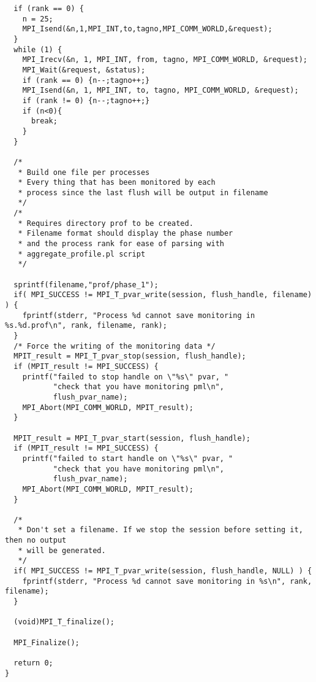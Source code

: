 \documentclass[notitlepage]{article}
\begin{document}
\begin{verbatim}
  if (rank == 0) {
    n = 25;
    MPI_Isend(&n,1,MPI_INT,to,tagno,MPI_COMM_WORLD,&request);
  }
  while (1) {
    MPI_Irecv(&n, 1, MPI_INT, from, tagno, MPI_COMM_WORLD, &request);
    MPI_Wait(&request, &status);
    if (rank == 0) {n--;tagno++;}
    MPI_Isend(&n, 1, MPI_INT, to, tagno, MPI_COMM_WORLD, &request);
    if (rank != 0) {n--;tagno++;}
    if (n<0){
      break;
    }
  }

  /* 
   * Build one file per processes
   * Every thing that has been monitored by each
   * process since the last flush will be output in filename
   */
  /*
   * Requires directory prof to be created.
   * Filename format should display the phase number
   * and the process rank for ease of parsing with
   * aggregate_profile.pl script
   */

  sprintf(filename,"prof/phase_1");
  if( MPI_SUCCESS != MPI_T_pvar_write(session, flush_handle, filename) ) {
    fprintf(stderr, "Process %d cannot save monitoring in %s.%d.prof\n", rank, filename, rank);
  }
  /* Force the writing of the monitoring data */
  MPIT_result = MPI_T_pvar_stop(session, flush_handle);
  if (MPIT_result != MPI_SUCCESS) {
    printf("failed to stop handle on \"%s\" pvar, "
           "check that you have monitoring pml\n",
           flush_pvar_name);
    MPI_Abort(MPI_COMM_WORLD, MPIT_result);
  }

  MPIT_result = MPI_T_pvar_start(session, flush_handle);
  if (MPIT_result != MPI_SUCCESS) {
    printf("failed to start handle on \"%s\" pvar, "
           "check that you have monitoring pml\n",
           flush_pvar_name);
    MPI_Abort(MPI_COMM_WORLD, MPIT_result);
  }

  /* 
   * Don't set a filename. If we stop the session before setting it, then no output
   * will be generated.
   */
  if( MPI_SUCCESS != MPI_T_pvar_write(session, flush_handle, NULL) ) {
    fprintf(stderr, "Process %d cannot save monitoring in %s\n", rank, filename);
  }

  (void)MPI_T_finalize();

  MPI_Finalize();
  
  return 0;
}

\end{verbatim}
\end{document}
